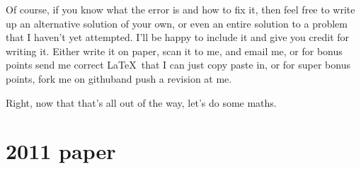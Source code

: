 \documentclass{article}
\begin{document}
Of course, if you know what the error is and how to fix it, then feel free to write up an alternative solution of your own, or even an entire solution to a problem that I haven't yet attempted. I'll be happy to include it and give you credit for writing it. Either write it on paper, scan it to me, and email me\footnotemark[1], or for bonus points send me correct \LaTeX\, that I can just copy paste in, or for super bonus points, fork me on github\footnotemark[4] and push a revision at me.

Right, now that that's all out of the way, let's do some maths.

\clearpage
\section*{2011 paper}
\end{document}
